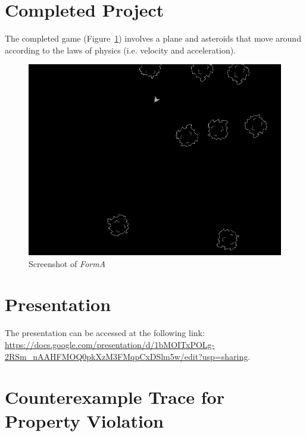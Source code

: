 \documentclass{article}
\newcommand{\Name}{\textit{FormA}\xspace}
\begin{document}
\section{Completed Project}
The completed game (Figure~\ref{fig:gameplay}) involves a plane and asteroids that move around according to the laws of physics (i.e. velocity and acceleration).

\begin{figure}[h!]
    \includegraphics[width=\linewidth]{gameplay.png}
    \caption{Screenshot of \Name}
    \label{fig:gameplay}
\end{figure}

\section{Presentation}
The presentation can be accessed at the following link: \url{https://docs.google.com/presentation/d/1bMOITxPOLg-2RSm_nAAHFMOQ0pkXzM3FMqpCxDSlm5w/edit?usp=sharing}.




\appendix
\section{Counterexample Trace for Property Violation}
\label{appendix:trace}

\end{document}
